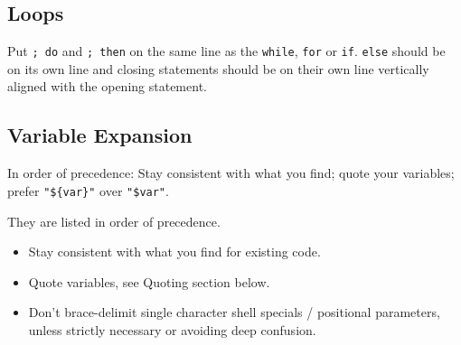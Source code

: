 \documentclass[
]{book}
\newenvironment{Shaded}{\begin{snugshade}}{\end{snugshade}}
\newcommand{\BuiltInTok}[1]{#1}
\newcommand{\CommentTok}[1]{\textcolor[rgb]{0.56,0.35,0.01}{\textit{#1}}}
\newcommand{\DataTypeTok}[1]{\textcolor[rgb]{0.13,0.29,0.53}{#1}}
\newcommand{\ExtensionTok}[1]{#1}
\newcommand{\KeywordTok}[1]{\textcolor[rgb]{0.13,0.29,0.53}{\textbf{#1}}}
\newcommand{\NormalTok}[1]{#1}
\newcommand{\StringTok}[1]{\textcolor[rgb]{0.31,0.60,0.02}{#1}}
\newcommand{\VariableTok}[1]{\textcolor[rgb]{0.00,0.00,0.00}{#1}}
\begin{document}
\hypertarget{loops}{%
\subsection{Loops}\label{loops}}

Put \texttt{;\ do} and \texttt{;\ then} on the same line as the \texttt{while}, \texttt{for} or \texttt{if}. \texttt{else}
should be on its own line and closing statements should be on their own line
vertically aligned with the opening statement.

\hypertarget{variable-expansion}{%
\subsection{Variable Expansion}\label{variable-expansion}}

In order of precedence: Stay consistent with what you find; quote your variables;
prefer \texttt{"\$\{var\}"} over \texttt{"\$var"}.

They are listed in order of precedence.

\begin{itemize}
\item
  Stay consistent with what you find for existing code.
\item
  Quote variables, see Quoting section below.
\item
  Don't brace-delimit single character shell specials / positional parameters,
  unless strictly necessary or avoiding deep confusion.

\begin{Shaded}
\end{Shaded}
\end{itemize}
\end{document}
